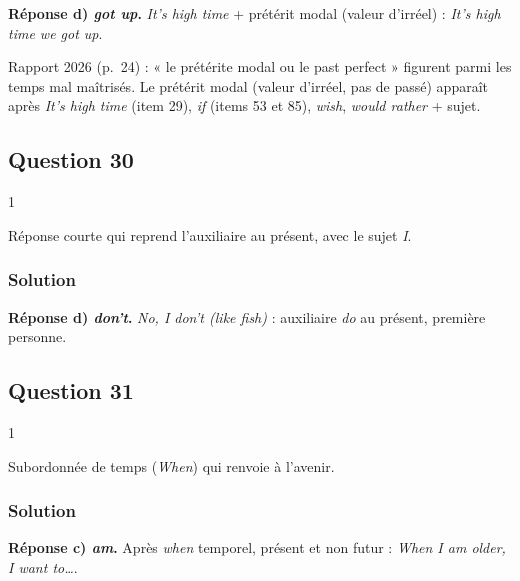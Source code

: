 \documentclass[11pt,a4paper]{article}
\begin{document}
\textbf{Réponse d) \emph{got up}.} \emph{It's high time} + prétérit modal (valeur d'irréel) : \emph{It's high time we got up}.

\begin{jury}

Rapport 2026 (p.~24) : « le prétérite modal ou le past perfect » figurent parmi les temps mal maîtrisés. Le prétérit modal (valeur d'irréel, pas de passé) apparaît après \emph{It's high time} (item 29), \emph{if} (items 53 et 85), \emph{wish}, \emph{would rather} + sujet.

\end{jury}

\hypertarget{question-30}{%
\subsection{Question 30}\label{question-30}}

\begin{indication}{1}

Réponse courte qui reprend l'auxiliaire au présent, avec le sujet \emph{I}.

\end{indication}

\hypertarget{solution-29}{%
\subsubsection{Solution}\label{solution-29}}

\textbf{Réponse d) \emph{don't}.} \emph{No, I don't (like fish)} : auxiliaire \emph{do} au présent, première personne.

\hypertarget{question-31}{%
\subsection{Question 31}\label{question-31}}

\begin{indication}{1}

Subordonnée de temps (\emph{When}) qui renvoie à l'avenir.

\end{indication}

\hypertarget{solution-30}{%
\subsubsection{Solution}\label{solution-30}}

\textbf{Réponse c) \emph{am}.} Après \emph{when} temporel, présent et non futur : \emph{When I am older, I want to\ldots{}}.
\end{document}
